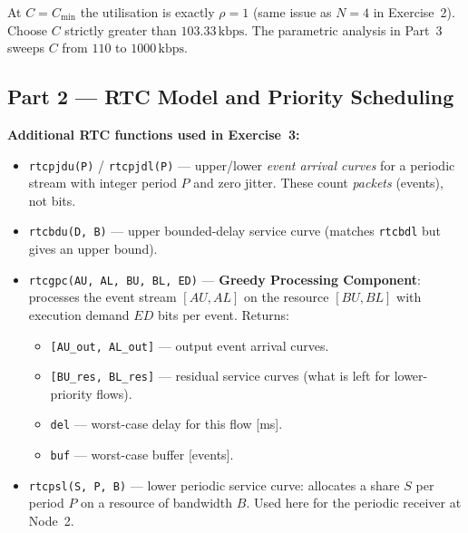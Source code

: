 \documentclass[12pt, a4paper]{article}
\begin{document}
\begin{warnbox}
  At $C = C_\mathrm{min}$ the utilisation is exactly $\rho = 1$
  (same issue as $N=4$ in Exercise~2).
  Choose $C$ strictly greater than $103.33\,\text{kbps}$.
  The parametric analysis in Part~3 sweeps $C$ from $110$ to $1000\,\text{kbps}$.
\end{warnbox}

\subsection*{Part 2 --- RTC Model and Priority Scheduling}

\begin{defbox}
  \textbf{Additional RTC functions used in Exercise~3:}
  \begin{itemize}[leftmargin=1.2em, itemsep=4pt]
    \item \texttt{rtcpjdu(P)} / \texttt{rtcpjdl(P)} --- upper/lower
      \emph{event arrival curves} for a periodic stream with integer
      period $P$ and zero jitter.
      These count \emph{packets} (events), not bits.

    \item \texttt{rtcbdu(D, B)} --- upper bounded-delay service curve
      (matches \texttt{rtcbdl} but gives an upper bound).

    \item \texttt{rtcgpc(AU, AL, BU, BL, ED)} --- \textbf{Greedy Processing
      Component}: processes the event stream $[AU, AL]$ on the resource
      $[BU, BL]$ with execution demand $ED$ bits per event.
      Returns:
      \begin{itemize}[leftmargin=1em, itemsep=1pt]
        \item \texttt{[AU\_out, AL\_out]} --- output event arrival curves.
        \item \texttt{[BU\_res, BL\_res]} --- residual service curves
          (what is left for lower-priority flows).
        \item \texttt{del} --- worst-case delay for this flow [ms].
        \item \texttt{buf} --- worst-case buffer [events].
      \end{itemize}

    \item \texttt{rtcpsl(S, P, B)} --- lower periodic service curve:
      allocates a share $S$ per period $P$ on a resource of bandwidth $B$.
      Used here for the periodic receiver at Node~2.
  \end{itemize}
\end{defbox}
\end{document}
